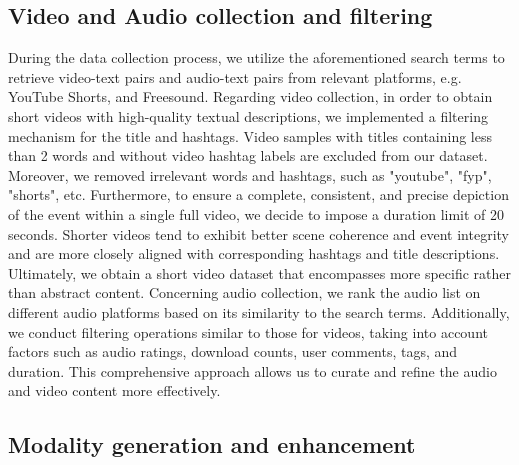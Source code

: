 \documentclass{article} \usepackage{iclr2024_conference,times}
\begin{document}
\subsection{Video and Audio collection and filtering}
\label{subsec: Video collection and filtering}
During the data collection process, we utilize the aforementioned search terms to retrieve video-text pairs and audio-text pairs from relevant platforms, e.g. YouTube Shorts, and Freesound. Regarding video collection, in order to obtain short videos with high-quality textual descriptions, we implemented a filtering mechanism for the title and hashtags. Video samples with titles containing less than 2 words and without video hashtag labels are excluded from our dataset. Moreover, we removed irrelevant words and hashtags, such as "youtube", "fyp", "shorts", etc. Furthermore, to ensure a complete, consistent, and precise depiction of the event within a single full video, we decide to impose a duration limit of 20 seconds. Shorter videos tend to exhibit better scene coherence and event integrity and are more closely aligned with corresponding hashtags and title descriptions. Ultimately, we obtain a short video dataset that encompasses more specific rather than abstract content. Concerning audio collection, we rank the audio list on different audio platforms based on its similarity to the search terms. Additionally, we conduct filtering operations similar to those for videos, taking into account factors such as audio ratings, download counts, user comments, tags, and duration. This comprehensive approach allows us to curate and refine the audio and video content more effectively. 







\subsection{Modality generation and enhancement}
\label{subsec:Modality generation and enhancement}
\end{document}
